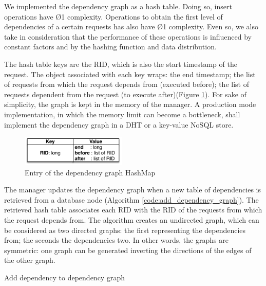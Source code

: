 We implemented the dependency graph as a hash table. Doing so, insert operations have \O{1} complexity. Operations to obtain the first level of dependencies of a certain requests has also have \O{1} complexity. Even so, we also take in consideration that the performance of these operations is influenced by constant factors and by the hashing function and data distribution.

The hash table keys are the \acf{RID}, which is also the start timestamp of the request. The object associated with each key wraps: the end timestamp; the list of requests from which the request depends from (executed before); the list of requests dependent from the request (to execute after)(Figure \ref{fig:impl:manager:graph}). For sake of simplicity, the graph is kept in the memory of the manager. A production mode implementation, in which the memory limit can become a bottleneck, shall implement the dependency graph in a \acf{DHT} or a key-value \acs{NoSQL} store.


\begin{figure}
  \centering
  \includegraphics[width=50mm]{arch/managerGraph}
  \caption{Entry of the dependency graph HashMap}
  \label{fig:impl:manager:graph}
\end{figure}


The manager updates the dependency graph when a new table of dependencies is retrieved from a database node (Algorithm \ref{code:add_dependency_graph}). The retrieved hash table associates each \acf{RID} with the \ac{RID} of the requests from which the request depends from. The algorithm creates an undirected graph, which can be considered as two directed graphs: the first representing the dependencies from; the seconds the dependencies two. In other words, the graphs are symmetric: one graph can be generated inverting the directions of the edges of the other graph.\\

 \begin{algorithm}[H]
 \DontPrintSemicolon{}
 	\;
 	\BlankLine
 	\caption{Add dependency to dependency graph}
	\label{code:add_dependency_graph}
\end{algorithm}

